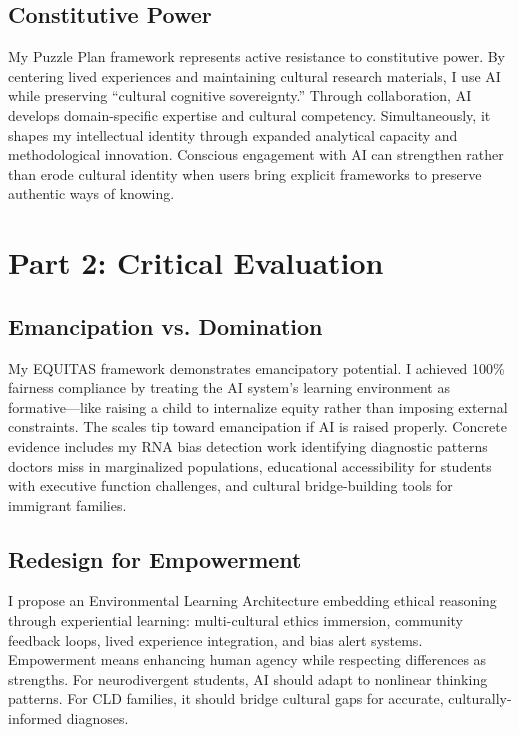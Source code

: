 \documentclass[11pt,twoside]{article}
\begin{document}
\subsection*{Constitutive Power}
My Puzzle Plan framework represents active resistance to constitutive power. By centering lived experiences and maintaining cultural research materials, I use AI while preserving ``cultural cognitive sovereignty.'' 
Through collaboration, AI develops domain-specific expertise and cultural competency. Simultaneously, it shapes my intellectual identity through expanded analytical capacity and methodological innovation. Conscious engagement with AI can strengthen rather than erode cultural identity when users bring explicit frameworks to preserve authentic ways of knowing.

\section*{Part 2: Critical Evaluation}

\subsection*{Emancipation vs. Domination}
My EQUITAS framework demonstrates emancipatory potential. I achieved 100\% fairness compliance by treating the AI system's learning environment as formative—like raising a child to internalize equity rather than imposing external constraints.
The scales tip toward emancipation if AI is raised properly. Concrete evidence includes my RNA bias detection work identifying diagnostic patterns doctors miss in marginalized populations, educational accessibility for students with executive function challenges, and cultural bridge-building tools for immigrant families.

\subsection*{Redesign for Empowerment}
I propose an Environmental Learning Architecture embedding ethical reasoning through experiential learning: multi-cultural ethics immersion, community feedback loops, lived experience integration, and bias alert systems.
Empowerment means enhancing human agency while respecting differences as strengths. For neurodivergent students, AI should adapt to nonlinear thinking patterns. For CLD families, it should bridge cultural gaps for accurate, culturally-informed diagnoses.
\end{document}
